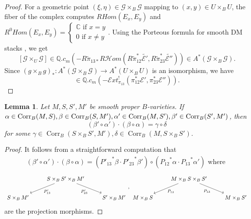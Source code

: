 \documentclass[11pt]{amsart}
\newtheorem{lemma}[theorem]{Lemma}
\theoremstyle{definition}
\newcommand{\Q}{\mathbb{Q}}
\begin{document}
\begin{proof}
   For a geometric point $(\xi, \eta)\in \mathcal G\times_B \mathcal G$ mapping to $(x, y)\in U\times_B U$, the fiber of the complex computes $RHom (E_x, E_y)$ and $R^0Hom (E_x, E_y) =\begin{cases}
       \mathbb C \text{ if }x=y \\ 0 \text{ if }x\neq y
   \end{cases}$. Using the Porteous formula for smooth DM stacks , we get
   $$[\mathcal G \times_U \mathcal G] \in \Q.c_m\left (-R {{\tilde \pi}_{13*}}R\mathscr Hom \left (R{\tilde \pi}_{12}^* \tilde {\mathcal E'} , R\tilde \pi_{23}^*\tilde{\mathcal E''}  \right )\right )\in A^*(\mathcal{G}\times_B\mathcal{G}).$$
  Since $(g\times_B g)_* : A^*(\mathcal G\times_B \mathcal G) \rightarrow A^*(U\times_B U)$ is an isomorphism, we have \begin{equation*}
       [\Delta_{U/B}] \in \Q. c_{m} \left (-\mathscr Ext^!_{\pi_{13}} \left (\pi_{12}^* \mathcal E', \pi_{23}^*\mathcal E''  \right ) \right ).
   \end{equation*}
 \end{proof}
  \begin{lemma}\label{lem2.2}
    Let $M,S,S',M'$ be smooth proper $B$-varieties. If $\alpha \in \operatorname{Corr}_B(M,S), \beta \in \operatorname{Corr}_B(S, M'),\\ \alpha'\in \operatorname{Corr}_B(M,S'), \beta'\in \operatorname{Corr}_B(S',M')$, then 
	\begin{equation*}
        (\beta'\circ \alpha')\cdot (\beta\circ \alpha)= \gamma \circ \delta 
    \end{equation*}
	 for some $\gamma \in \operatorname{Corr}_B(S\times_B S', M'), \delta \in \operatorname{Corr}_B(M, S\times_B S')$.
\end{lemma}
\begin{proof}
    It follows from a straightforward computation that \begin{equation*}
        \begin{aligned}
         (\beta'\circ \alpha')\cdot (\beta\circ \alpha) =  \left ({P'_{13}}^* \beta\cdot {P'_{23}}^* \beta'  \right ) \circ \left ({P_{12}}^* \alpha\cdot {P_{13}}^* \alpha' \right ) \text{ where }
        \end{aligned}
    \end{equation*} 
    $$\begin{tikzcd}
       & S\times_B S' \times_B M'\arrow{rd}[swap]{P'_{23}}\arrow{ld}{P'_{13}} & \\ S\times_B M' & &S'\times_B M'
    \end{tikzcd} ,\begin{tikzcd}
       & M\times_B S\times_B S' \arrow{rd}[swap]{P_{13}}\arrow{ld}{P_{12}} & \\ M\times_B S & &M\times_B S'
    \end{tikzcd}$$ are the projection morphisms.  
\end{proof}
\end{document}
